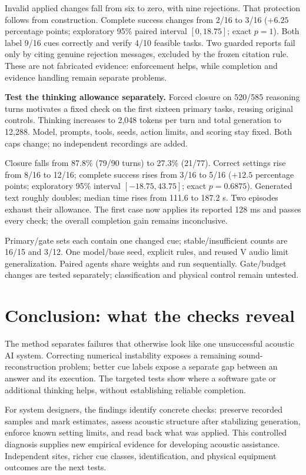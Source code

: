 \documentclass[runningheads,orivec]{llncs}
\begin{document}
Invalid applied changes fall from six to zero, with nine rejections. That protection follows from construction. Complete success changes from 2/16 to 3/16 ($+6.25$ percentage points; exploratory 95\% paired interval $[0,18.75]$; exact $p=1$). Both label 9/16 cues correctly and verify 4/10 feasible tasks. Two guarded reports fail only by citing genuine rejection messages, excluded by the frozen citation rule. These are not fabricated evidence: enforcement helps, while completion and evidence handling remain separate problems.

\textbf{Test the thinking allowance separately.} Forced closure on 520/585 reasoning turns motivates a fixed check on the first sixteen primary tasks, reusing original controls. Thinking increases to 2,048 tokens per turn and total generation to 12,288. Model, prompts, tools, seeds, action limits, and scoring stay fixed. Both caps change; no independent recordings are added.

Closure falls from 87.8\% (79/90 turns) to 27.3\% (21/77). Correct settings rise from 8/16 to 12/16; complete success rises from 3/16 to 5/16 ($+12.5$ percentage points; exploratory 95\% interval $[-18.75,43.75]$; exact $p=0.6875$). Generated text roughly doubles; median time rises from 111.6 to 187.2 s. Two episodes exhaust their allowance. The first case now applies its reported 128 ms and passes every check; the overall completion gain remains inconclusive.

Primary/gate sets each contain one changed cue; stable/insufficient counts are 16/15 and 3/12. One model/base seed, explicit rules, and reused V audio limit generalization. Paired agents share weights and run sequentially. Gate/budget changes are tested separately; classification and physical control remain untested.

\section{Conclusion: what the checks reveal}

The method separates failures that otherwise look like one unsuccessful acoustic AI system. Correcting numerical instability exposes a remaining sound-reconstruction problem; better cue labels expose a separate gap between an answer and its execution. The targeted tests show where a software gate or additional thinking helps, without establishing reliable completion.

For system designers, the findings identify concrete checks: preserve recorded samples and mark estimates, assess acoustic structure after stabilizing generation, enforce known setting limits, and read back what was applied. This controlled diagnosis supplies new empirical evidence for developing acoustic assistance. Independent sites, richer cue classes, identification, and physical equipment outcomes are the next tests.
\end{document}
